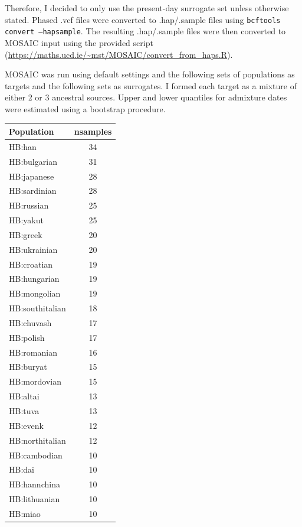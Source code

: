 Therefore, I decided to only use the present-day surrogate set unless otherwise stated. Phased .vcf files were converted to .hap/.sample files using \texttt{bcftools convert --hapsample}. The resulting .hap/.sample files were then converted to MOSAIC input using the provided script (\url{https://maths.ucd.ie/~mst/MOSAIC/convert_from_haps.R}).

MOSAIC was run using default settings and the following sets of populations as targets and the following sets as surrogates. I formed each target as a mixture of either 2 or 3 ancestral sources. Upper and lower quantiles for admixture dates were estimated using a bootstrap procedure. 

\begin{table}
\small
\begin{tabular}{l|c}
\hline
Population & nsamples\\
\hline
HB:han & 34\\
\hline
HB:bulgarian & 31\\
\hline
HB:japanese & 28\\
\hline
HB:sardinian & 28\\
\hline
HB:russian & 25\\
\hline
HB:yakut & 25\\
\hline
HB:greek & 20\\
\hline
HB:ukrainian & 20\\
\hline
HB:croatian & 19\\
\hline
HB:hungarian & 19\\
\hline
HB:mongolian & 19\\
\hline
HB:southitalian & 18\\
\hline
HB:chuvash & 17\\
\hline
HB:polish & 17\\
\hline
HB:romanian & 16\\
\hline
HB:buryat & 15\\
\hline
HB:mordovian & 15\\
\hline
HB:altai & 13\\
\hline
HB:tuva & 13\\
\hline
HB:evenk & 12\\
\hline
HB:northitalian & 12\\
\hline
HB:cambodian & 10\\
\hline
HB:dai & 10\\
\hline
HB:hannchina & 10\\
\hline
HB:lithuanian & 10\\
\hline
HB:miao & 10\\

\end{tabular}
\end{table}
